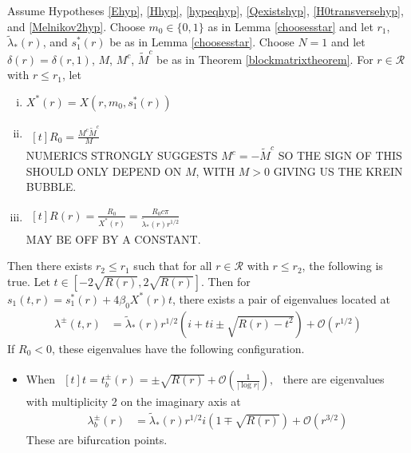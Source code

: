 \documentclass[thesis.tex]{subfiles}
\begin{document}
\begin{theorem}\label{theorem:kreinbubbles}
Assume Hypotheses \ref{Ehyp}, \ref{Hhyp}, \ref{hypeqhyp}, \ref{Qexistshyp}, \ref{H0transversehyp}, and \ref{Melnikov2hyp}. Choose $m_0 \in \{0, 1\}$ as in Lemma \ref{choosesstar} and let $r_1$, $\tilde{\lambda}_*(r)$, and $s_1^*(r)$ be as in Lemma \ref{choosesstar}. Choose $N = 1$ and let $\delta(r) = \delta(r,1)$, $M$, $M^c$, $\tilde{M}^c$ be as in Theorem \ref{blockmatrixtheorem}. For $r \in \mathcal{R}$ with $r \leq r_1$, let
\begin{enumerate}[(i)]
\item $X^*(r) = X(r, m_0, s_1^*(r))$
\item
$
\begin{aligned}[t]
R_0 = \frac{M^c \tilde{M}^c}{M}
\end{aligned}
$\\
NUMERICS STRONGLY SUGGESTS $M^c = -\tilde{M}^c$ SO THE SIGN OF THIS SHOULD ONLY DEPEND ON $M$, WITH $M>0$ GIVING US THE KREIN BUBBLE.
\item
$
\begin{aligned}[t]
R(r) = \frac{R_0}{X^*(r)} = \frac{R_0 c \pi}{\tilde{\lambda}_*(r) r^{1/2}}
\end{aligned}
$\\
MAY BE OFF BY A CONSTANT.
\end{enumerate}

Then there exists $r_2 \leq r_1$ such that for all $r \in \mathcal{R}$ with $r \leq r_2$, the following is true. Let $t \in \left[-2\sqrt{R(r)}, 2\sqrt{R(r)}\right]$. Then for $s_1(t,r) = s_1^*(r) + 4 \beta_0 X^*(r) t$, there exists a pair of eigenvalues located at
\begin{align*}
\lambda^\pm(t, r) &= \tilde{\lambda}_*(r) r^{1/2} \left( i + t i \pm \sqrt{ R(r) - t^2 } \right) + \mathcal{O}\left(r^{1/2} \right)
\end{align*}
If $R_0 < 0$, these eigenvalues have the following configuration.
\begin{itemize}
\item When
$
\begin{aligned}[t]
t = t_b^\pm(r) = \pm \sqrt{R(r)} + \mathcal{O}\left( \frac{1}{|\log r|} \right),
\end{aligned}
$
there are eigenvalues with multiplicity 2 on the imaginary axis at 
\begin{align*}
\lambda_b^\pm(r) &= \tilde{\lambda}_*(r) r^{1/2} i \left( 1 \mp \sqrt{R(r)}\right) + \mathcal{O}\left( r^{3/2} \right) 
\end{align*}
These are bifurcation points.


\end{itemize}
\end{theorem}
\end{document}
